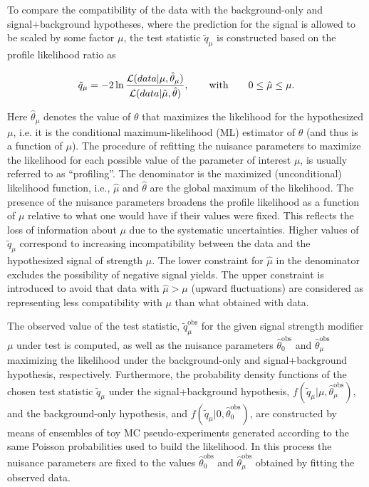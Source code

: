 To compare the compatibility of the data with the background-only and signal+background hypotheses, where the prediction for the signal is allowed to be scaled by some factor $\mu$,
the test statistic $\tilde{q}_\mu$ is constructed based on the profile likelihood ratio as

\begin{equation}\label{eqn:testStatistic}
\tilde{q}_\mu = -2\ln\frac{{\cal L}(data | \mu,\hat{\theta}_\mu)}{{\cal L}( data | \hat{\mu},\hat{\theta})},\qquad \mathrm{with} \qquad 0 \leq \hat{\mu} \leq \mu.
\end{equation}

Here $\hat{\theta}_\mu$ denotes the value of $\theta$ that maximizes the likelihood for the hypothesized $\mu$,
i.e. it is the conditional maximum-likelihood (ML) estimator of $\theta$ (and thus is a function of $\mu$). 
The procedure of refitting the nuisance parameters to maximize the likelihood for each possible value of the parameter of interest $\mu$, is usually referred to as ``profiling''.
The denominator is the maximized (unconditional) likelihood function, i.e., $\hat{\mu}$ and $\hat{\theta}$ are the global maximum of the likelihood.
The presence of the nuisance parameters broadens the profile likelihood as a function of $\mu$ relative to what one would have if their values were fixed.
This reflects the loss of information about $\mu$ due to the systematic uncertainties.
Higher values of $\tilde{q}_\mu$ correspond to increasing incompatibility between the data and the hypothesized signal of strength $\mu$.
The lower constraint for $\hat{\mu}$ in the denominator excludes the possibility of negative signal yields. 
The upper constraint is introduced to avoid that data with $\hat{\mu} > \mu$ (upward fluctuations) are considered as representing less compatibility with $\mu$ than what obtained with data.

The observed value of the test statistic, $\tilde{q}_\mu^\mathrm{obs}$ for the given signal strength modifier $\mu$ under test is computed,
as well as the nuisance parameters $\hat{\theta}_0^\mathrm{obs}$ and $\hat{\theta}_\mu^\mathrm{obs}$ maximizing the likelihood under the background-only and signal+background hypothesis, respectively.
Furthermore, the probability density functions of the chosen test statistic $\tilde{q}_\mu$ under the signal+background hypothesis, $f(\tilde{q}_\mu|\mu,\hat{\theta}_\mu^\mathrm{obs})$,
and the background-only hypothesis, and $f(\tilde{q}_\mu|0,\hat{\theta}_0^\mathrm{obs})$, are constructed by means of ensembles of toy MC pseudo-experiments
generated according to the same Poisson probabilities used to build the likelihood. In this process the nuisance parameters 
are fixed to the values $\hat{\theta}_0^\mathrm{obs}$ and $\hat{\theta}_\mu^\mathrm{obs}$ obtained by fitting the observed data.

